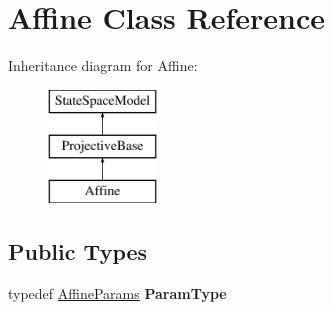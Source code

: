 \hypertarget{classAffine}{\section{Affine Class Reference}
\label{classAffine}
}
Inheritance diagram for Affine\-:\begin{figure}[H]
\begin{center}
\leavevmode
\includegraphics[height=3.000000cm]{classAffine}
\end{center}
\end{figure}
\subsection*{Public Types}
\begin{DoxyCompactItemize}
\item 
\hypertarget{classAffine_a1508564783c199efb28ec63911b1b1bf}{typedef \hyperlink{structAffineParams}{Affine\-Params} {\bfseries Param\-Type}}\label{classAffine_a1508564783c199efb28ec63911b1b1bf}

\end{DoxyCompactItemize}
